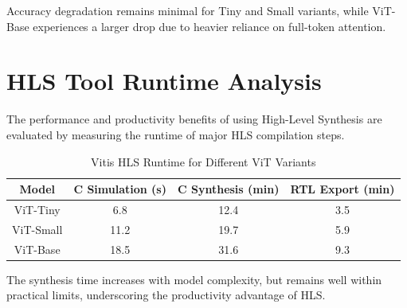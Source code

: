 Accuracy degradation remains minimal for Tiny and Small variants, while ViT-Base experiences a larger drop due to heavier reliance on full-token attention.


\section{HLS Tool Runtime Analysis}

The performance and productivity benefits of using High-Level Synthesis are evaluated by measuring the runtime of major HLS compilation steps.

\begin{table}[h!]
\centering
\caption{Vitis HLS Runtime for Different ViT Variants}
\begin{tabular}{|c|c|c|c|}
\hline
\textbf{Model} &
\textbf{C Simulation (s)} &
\textbf{C Synthesis (min)} &
\textbf{RTL Export (min)} \\ \hline
ViT-Tiny  & 6.8  & 12.4 & 3.5 \\ \hline
ViT-Small & 11.2 & 19.7 & 5.9 \\ \hline
ViT-Base  & 18.5 & 31.6 & 9.3 \\ \hline
\end{tabular}
\label{table:hls_runtime}
\end{table}




The synthesis time increases with model complexity, but remains well within practical limits, underscoring the productivity advantage of HLS.



